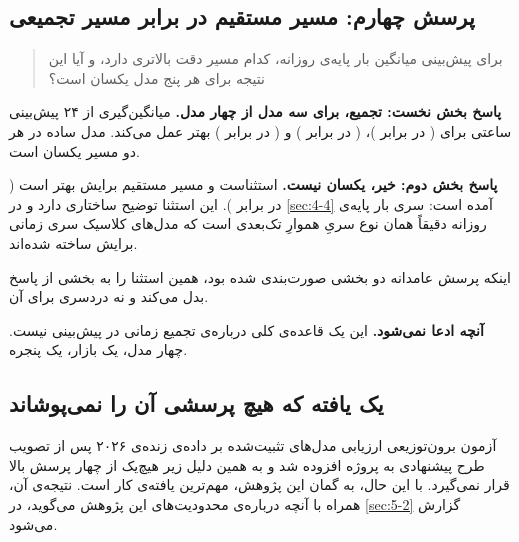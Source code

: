 \subsection*{پرسش چهارم: مسیر مستقیم در برابر مسیر تجمیعی}

\begin{quote}
برای پیش‌بینی میانگین بار پایه‌ی روزانه، کدام مسیر دقت بالاتری دارد، و
آیا این نتیجه برای هر پنج مدل یکسان است؟
\end{quote}

\textbf{پاسخ بخش نخست: تجمیع، برای سه مدل از چهار مدل.} میانگین‌گیری از ۲۴
پیش‌بینی ساعتی برای  ( در برابر )،
 ( در برابر ) و  ( در
برابر ) بهتر عمل می‌کند. مدل ساده در هر دو مسیر یکسان است.

\textbf{پاسخ بخش دوم: خیر، یکسان نیست.}  استثناست و مسیر مستقیم
برایش بهتر است ( در برابر ). این استثنا توضیح ساختاری
دارد و در \cref{sec:4-4} آمده است: سری بار پایه‌ی روزانه دقیقاً همان نوع سریِ
هموارِ تک‌بعدی است که مدل‌های کلاسیک سری زمانی برایش ساخته شده‌اند.

اینکه پرسش عامدانه دو بخشی صورت‌بندی شده بود، همین استثنا را به بخشی از پاسخ
بدل می‌کند و نه دردسری برای آن.

\textbf{آنچه ادعا نمی‌شود.} این یک قاعده‌ی کلی درباره‌ی تجمیع زمانی در پیش‌بینی
نیست. چهار مدل، یک بازار، یک پنجره.

\subsection*{یک یافته که هیچ پرسشی آن را نمی‌پوشاند}

{
آزمون برون‌توزیعی  ارزیابی مدل‌های تثبیت‌شده بر داده‌ی زنده‌ی ۲۰۲۶
 پس از تصویب طرح پیشنهادی به پروژه افزوده شد و به همین دلیل زیر هیچ‌یک از
چهار پرسش بالا قرار نمی‌گیرد. با این حال، به گمان این پژوهش، مهم‌ترین یافته‌ی
کار است. نتیجه‌ی آن، همراه با آنچه درباره‌ی محدودیت‌های این پژوهش می‌گوید، در
\cref{sec:5-2} گزارش می‌شود.\par}
